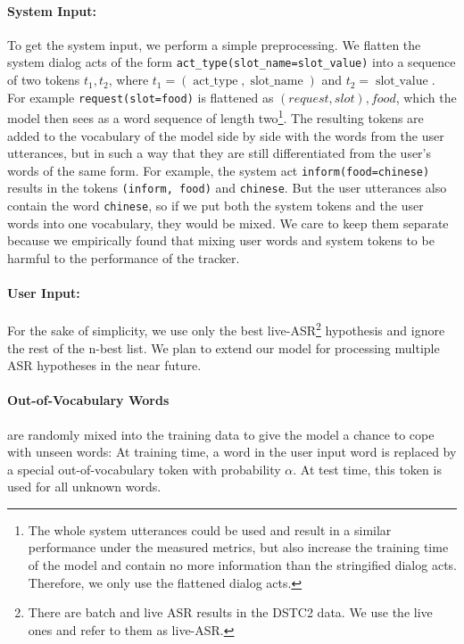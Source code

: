\documentclass[runningheads,a4paper]{llncs}
\begin{document}
\paragraph*{System Input:}
To get the system input, we perform a simple preprocessing. We flatten the system dialog acts of the form \texttt{act\_type(slot\_name=slot\_value)} into a sequence of two tokens $t_1, t_2$, where $t_1=(\operatorname{act\_type}, \operatorname{slot\_name})$ and $t_2=\operatorname{slot\_value}$. For example \texttt{request(slot=food)} is flattened as $(request, slot), food$, which the model then sees as a word sequence of length two\footnote{The whole system utterances could be used and result in a similar performance under the measured metrics, but also increase the training time of the model and contain no more information than the stringified dialog acts. Therefore, we only use the flattened dialog acts.}. The resulting tokens are added to the vocabulary of the model side by side with the words from the user utterances, but in such a way that they are still differentiated from the user's words of the same form. For example, the system act \texttt{inform(food=chinese)} results in the tokens \texttt{(inform, food)} and \texttt{chinese}. But the user utterances also contain the word \texttt{chinese}, so if we put both the system tokens and the user words into one vocabulary, they would be mixed. We care to keep them separate because we empirically found that mixing user words and system tokens to be harmful to the performance of the tracker.

\paragraph*{User Input:}
For the sake of simplicity, we use only the best live-ASR\footnote{There are batch and live ASR results in the DSTC2 data. We use the live ones and refer to them as live-ASR.} hypothesis and ignore the rest of the n-best list.
We plan to extend our model for processing multiple ASR hypotheses in the near future.

\paragraph*{Out-of-Vocabulary Words}
are randomly mixed into the training data to give the model a chance to cope with unseen words: At training time, a word in the user input word is replaced by a special out-of-vocabulary token with probability $\alpha$. At test time, this token is used for all unknown words.
\end{document}
